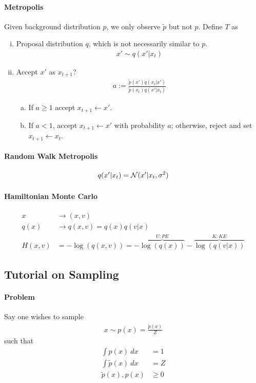 \documentclass{article}
\begin{document}
	\paragraph{Metropolis} Given background distribution $p$, we only observe $\tilde{p}$ but not $p$. Define $T$ as
	\begin{enumerate}[(i)]
		\item Proposal distribution $q$, which is not necessarily similar to $p$.
		\begin{align}
			x' \sim q(x'|x_t)
		\end{align}
		\item Accept $x'$ as $x_{t+1}$? 
		\begin{align}
			a := \frac{\tilde{p}(x') q(x_t|x')}{\tilde{p}(x_t) q(x'|x_t)}
		\end{align}
		\begin{enumerate}[(a)]
			\item If $a \geq 1$ accept $x_{t+1} \leftarrow x'$.
			\item If $a < 1$, accept $x_{t+1} \leftarrow x'$ with probability $a$; otherwise, reject and set $x_{t+1} \leftarrow x_t$.
		\end{enumerate}
	\end{enumerate}
	
	\paragraph{Random Walk Metropolis}
	\begin{align}
		q(x'|x_t) = \mathcal{{N}} (x'|x_t, \sigma^2)
	\end{align}

	\paragraph{Hamiltonian Monte Carlo}
	\begin{align}
		x &\to (x, v) \\
		q(x) &\to q(x, v) = q(x) q(v|x) \\
		H(x, v) &= - \log(q(x, v)) = - \overbrace{\log(q(x))}^{U: PE} - \overbrace{\log(q(v|x))}^{K: KE}
	\end{align}
	
	\subsection{Tutorial on Sampling}
	\paragraph{Problem} Say one wishes to sample 
	\begin{align}
		x \sim p(x) = \frac{\tilde{p}(x)}{Z}
	\end{align}
	such that
	\begin{align}
		\int p(x)\ dx &= 1 \\
		\int \tilde{p}(x)\ dx &= Z \\
		\tilde{p}(x), p(x) &\geq 0
	\end{align}
\end{document}
